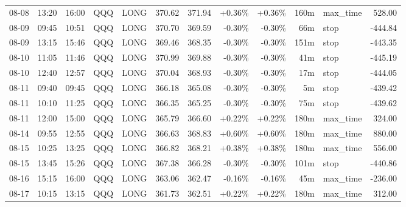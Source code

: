 \documentclass[11pt,a4paper,twoside]{article}
\begin{document}
\begin{center}
\begin{longtable}{>{\color{txtmain}}l l l l l r r r r r >{\color{txtmain}}l r}
08-08 & 13:20 & 16:00 & QQQ & LONG & 370.62 & 371.94 & \textcolor{wingreen}{+0.36\%} & \textcolor{wingreen}{+0.36\%} & 160m & max\_time & \textcolor{wingreen}{528.00} \\
08-09 & 09:45 & 10:51 & QQQ & LONG & 370.70 & 369.59 & \textcolor{lossred}{-0.30\%} & \textcolor{lossred}{-0.30\%} & 66m & stop & \textcolor{lossred}{-444.84} \\
08-09 & 13:15 & 15:46 & QQQ & LONG & 369.46 & 368.35 & \textcolor{lossred}{-0.30\%} & \textcolor{lossred}{-0.30\%} & 151m & stop & \textcolor{lossred}{-443.35} \\
08-10 & 11:05 & 11:46 & QQQ & LONG & 370.99 & 369.88 & \textcolor{lossred}{-0.30\%} & \textcolor{lossred}{-0.30\%} & 41m & stop & \textcolor{lossred}{-445.19} \\
08-10 & 12:40 & 12:57 & QQQ & LONG & 370.04 & 368.93 & \textcolor{lossred}{-0.30\%} & \textcolor{lossred}{-0.30\%} & 17m & stop & \textcolor{lossred}{-444.05} \\
08-11 & 09:40 & 09:45 & QQQ & LONG & 366.18 & 365.08 & \textcolor{lossred}{-0.30\%} & \textcolor{lossred}{-0.30\%} & 5m & stop & \textcolor{lossred}{-439.42} \\
08-11 & 10:10 & 11:25 & QQQ & LONG & 366.35 & 365.25 & \textcolor{lossred}{-0.30\%} & \textcolor{lossred}{-0.30\%} & 75m & stop & \textcolor{lossred}{-439.62} \\
08-11 & 12:00 & 15:00 & QQQ & LONG & 365.79 & 366.60 & \textcolor{wingreen}{+0.22\%} & \textcolor{wingreen}{+0.22\%} & 180m & max\_time & \textcolor{wingreen}{324.00} \\
08-14 & 09:55 & 12:55 & QQQ & LONG & 366.63 & 368.83 & \textcolor{wingreen}{+0.60\%} & \textcolor{wingreen}{+0.60\%} & 180m & max\_time & \textcolor{wingreen}{880.00} \\
08-15 & 10:25 & 13:25 & QQQ & LONG & 366.82 & 368.21 & \textcolor{wingreen}{+0.38\%} & \textcolor{wingreen}{+0.38\%} & 180m & max\_time & \textcolor{wingreen}{556.00} \\
08-15 & 13:45 & 15:26 & QQQ & LONG & 367.38 & 366.28 & \textcolor{lossred}{-0.30\%} & \textcolor{lossred}{-0.30\%} & 101m & stop & \textcolor{lossred}{-440.86} \\
08-16 & 15:15 & 16:00 & QQQ & LONG & 363.06 & 362.47 & \textcolor{lossred}{-0.16\%} & \textcolor{lossred}{-0.16\%} & 45m & max\_time & \textcolor{lossred}{-236.00} \\
08-17 & 10:15 & 13:15 & QQQ & LONG & 361.73 & 362.51 & \textcolor{wingreen}{+0.22\%} & \textcolor{wingreen}{+0.22\%} & 180m & max\_time & \textcolor{wingreen}{312.00} \\

\end{longtable}
\end{center}
\end{document}
